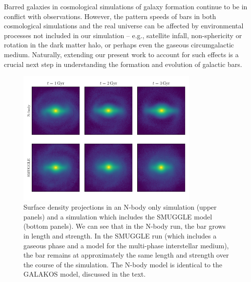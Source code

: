 \documentclass{natureprintstyle}
\begin{document}
Barred galaxies in cosmological simulations of galaxy formation continue to be
in conflict with observations.\cite{2017MNRAS.469.1054A, 2019MNRAS.483.2721P,
2021AA...650L..16F} However, the pattern speeds of bars in both cosmological
simulations and the real universe can be affected by environmental processes
not included in our simulation -- e.g., satellite
infall\cite{2011Natur.477..301P}, non-sphericity\cite{2013MNRAS.429.1949A} or
rotation\cite{2013MNRAS.434.1287S, 2014ApJ...783L..18L, 2018MNRAS.476.1331C,
2019MNRAS.488.5788C} in the dark matter halo, or perhaps even the gaseous
circumgalactic medium. Naturally, extending our present work to account for
such effects is a crucial next step in understanding the formation and
evolution of galactic bars.

\begin{figure}[h]%
\centering
\includegraphics[width=0.8\textwidth]{fig/fig1.pdf}
\caption{Surface density projections in an N-body only simulation (upper
panels) and a simulation which includes the SMUGGLE model (bottom panels). We
can see that in the N-body run, the bar grows in length and strength. In the
SMUGGLE run (which includes a gaseous phase and a model for the multi-phase
interstellar medium), the bar remains at approximately the same length and
strength over the course of the simulation. The N-body model is identical to
the GALAKOS model, discussed in the text.}\label{fig:overview}
\end{figure}
\end{document}
